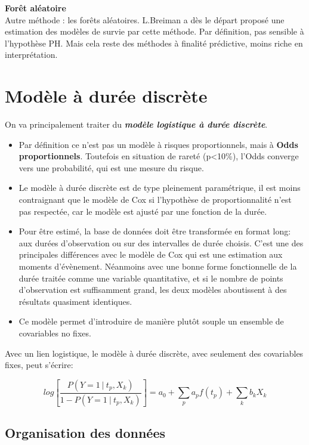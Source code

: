\documentclass[
  12pt,
  letterpaper,
  DIV=11,
  numbers=noendperiod,
  onepage,
  openany]{scrreprt}
\providecommand{\tightlist}{%
  \setlength{\itemsep}{0pt}\setlength{\parskip}{0pt}}\usepackage{longtable,booktabs,array}
\begin{document}
\textbf{Forêt aléatoire}\\
Autre méthode : les forêts aléatoires. L.Breiman a dès le départ proposé
une estimation des modèles de survie par cette méthode. Par définition,
pas sensible à l'hypothèse PH. Mais cela reste des méthodes à finalité
prédictive, moins riche en interprétation.

\hypertarget{moduxe8le-uxe0-duruxe9e-discruxe8te}{%
\chapter{\texorpdfstring{\textbf{Modèle à durée
discrète}}{Modèle à durée discrète}}\label{moduxe8le-uxe0-duruxe9e-discruxe8te}}

On va principalement traiter du \textbf{\emph{modèle logistique à durée
discrète}}.

\begin{itemize}
\tightlist
\item
  Par définition ce n'est pas un modèle à risques proportionnels, mais à
  \textbf{Odds proportionnels}. Toutefois en situation de rareté
  (p\textless10\%), l'Odds converge vers une probabilité, qui est une
  mesure du risque.
\item
  Le modèle à durée discrète est de type pleinement paramétrique, il est
  moins contraignant que le modèle de Cox si l'hypothèse de
  proportionnalité n'est pas respectée, car le modèle est ajusté par une
  fonction de la durée.
\item
  Pour être estimé, la base de données doit être transformée en format
  long: aux durées d'observation ou sur des intervalles de durée
  choisis. C'est une des principales différences avec le modèle de Cox
  qui est une estimation aux moments d'évènement. Néanmoins avec une
  bonne forme fonctionnelle de la durée traitée comme une variable
  quantitative, et si le nombre de points d'observation est suffisamment
  grand, les deux modèles aboutissent à des résultats quasiment
  identiques.
\item
  Ce modèle permet d'introduire de manière plutôt souple un ensemble de
  covariables no fixes.
\end{itemize}

Avec un lien logistique, le modèle à durée discrète, avec seulement des
covariables fixes, peut s'écrire:

\[log\left[\frac{P(Y=1\ |\ t_p,X_k)}{1-P(Y=1\ |\ t_p,X_k)}\right]= a_0 + \sum_{p}a_pf(t_p)+\sum_{k}b_kX_k\]

\hypertarget{organisation-des-donnuxe9es}{%
\section{Organisation des données}\label{organisation-des-donnuxe9es}}
\end{document}
